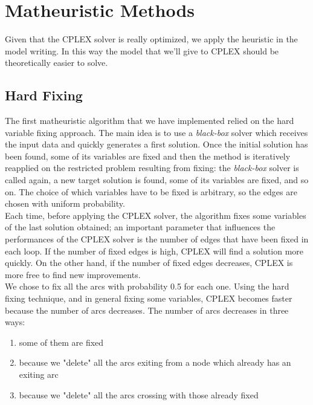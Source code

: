 
\chapter{Matheuristic Methods}
\label{chp:4-Matheuristics}
Given that the \textsc{CPLEX} solver is really optimized, we apply the heuristic in the model writing. In this way the model that we’ll give to \textsc{CPLEX} should be theoretically easier to solve.

\section{Hard Fixing}
The first matheuristic algorithm that we have implemented relied on the hard variable fixing approach. The main idea is to use a \textit{black-box} solver which receives the input data and quickly generates a first solution. Once the initial solution has been found, some of its variables are fixed and then the method is iteratively reapplied on the restricted problem resulting from fixing: the \textit{black-box} solver is called again, a new target solution is found, some of its variables are fixed, and so on. The choice of which variables have to be fixed is arbitrary, so the edges are chosen with uniform probability.\\
Each time, before applying the \textsc{CPLEX} solver, the algorithm fixes some variables of the last solution obtained; an important parameter that influences the performances of the \textsc{CPLEX} solver is the number of edges that have been fixed in each loop. If the number of fixed edges is high, \textsc{CPLEX} will find a solution more quickly. On the other hand, if the number of fixed edges decreases, \textsc{CPLEX} is more free to find new improvements. \\
We chose to fix all the arcs with probability 0.5 for each one. 
Using the hard fixing technique, and in general fixing some variables, \textsc{CPLEX} becomes faster because the number of arcs decreases. The number of arcs decreases in three ways: 
\begin{enumerate}
\item some of them are fixed
\item because we "delete" all the arcs exiting from a node which already has an exiting arc
\item because we "delete" all the arcs crossing with those already fixed 
\end{enumerate}
